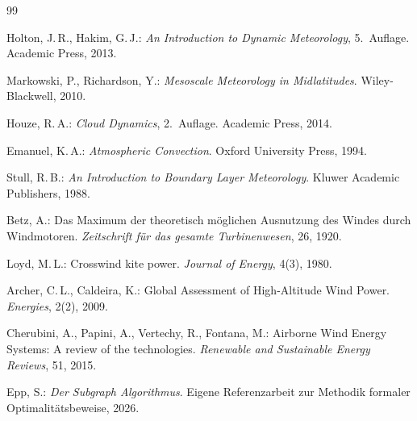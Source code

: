 ﻿\documentclass[a4paper,12pt]{article}
\theoremstyle{definition}
\begin{document}
\begin{thebibliography}{99}

Holton, J.\,R., Hakim, G.\,J.:
\emph{An Introduction to Dynamic Meteorology}, 5.\ Auflage.
Academic Press, 2013.

Markowski, P., Richardson, Y.:
\emph{Mesoscale Meteorology in Midlatitudes}.
Wiley-Blackwell, 2010.

Houze, R.\,A.:
\emph{Cloud Dynamics}, 2.\ Auflage.
Academic Press, 2014.

Emanuel, K.\,A.:
\emph{Atmospheric Convection}.
Oxford University Press, 1994.

Stull, R.\,B.:
\emph{An Introduction to Boundary Layer Meteorology}.
Kluwer Academic Publishers, 1988.

Betz, A.:
Das Maximum der theoretisch möglichen Ausnutzung des Windes durch
Windmotoren.
\emph{Zeitschrift für das gesamte Turbinenwesen}, 26, 1920.

Loyd, M.\,L.:
Crosswind kite power.
\emph{Journal of Energy}, 4(3), 1980.

Archer, C.\,L., Caldeira, K.:
Global Assessment of High-Altitude Wind Power.
\emph{Energies}, 2(2), 2009.

Cherubini, A., Papini, A., Vertechy, R., Fontana, M.:
Airborne Wind Energy Systems: A review of the technologies.
\emph{Renewable and Sustainable Energy Reviews}, 51, 2015.

Epp, S.:
\emph{Der Subgraph Algorithmus}.
Eigene Referenzarbeit zur Methodik formaler Optimalitätsbeweise, 2026.

\end{thebibliography}
\end{document}
